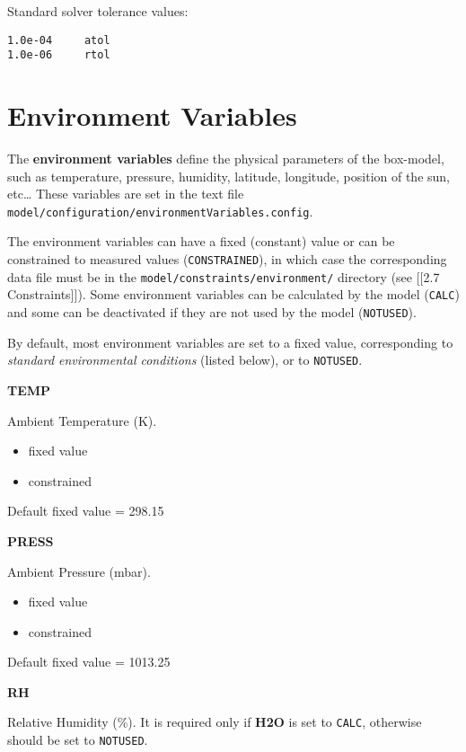 Standard solver tolerance values:

\begin{verbatim}
1.0e-04     atol
1.0e-06     rtol
\end{verbatim}

\section{Environment Variables} \label{sec:envvar}

The \textbf{environment variables} define the physical parameters of the
box-model, such as temperature, pressure, humidity, latitude, longitude,
position of the sun, etc\ldots{} These variables are set in the text
file \texttt{model/configuration/environmentVariables.config}.

The environment variables can have a fixed (constant) value or can be
constrained to measured values (\texttt{CONSTRAINED}), in which case the
corresponding data file must be in the
\texttt{model/constraints/environment/} directory (see {[}{[}2.7
Constraints{]}{]}). Some environment variables can be calculated by the
model (\texttt{CALC}) and some can be deactivated if they are not used
by the model (\texttt{NOTUSED}).

By default, most environment variables are set to a fixed value,
corresponding to \emph{standard environmental conditions} (listed
below), or to \texttt{NOTUSED}.

\textbf{TEMP}

Ambient Temperature (K).

\begin{itemize}
\item fixed value
\item constrained
\end{itemize}

Default fixed value = 298.15

\textbf{PRESS}

Ambient Pressure (mbar).

\begin{itemize}
\item fixed value
\item constrained
\end{itemize}

Default fixed value = 1013.25

\textbf{RH}

Relative Humidity (\%). It is required only if \textbf{H2O} is set to
\texttt{CALC}, otherwise should be set to \texttt{NOTUSED}.

